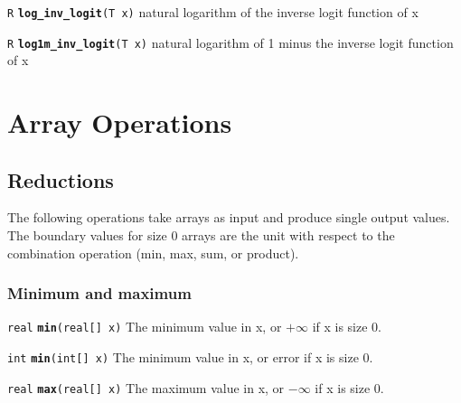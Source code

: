 \documentclass[
  10pt,
]{book}
\begin{document}
\texttt{R} \textbf{\texttt{log\_inv\_logit}}\texttt{(T\ x)}\newline
natural logarithm of the inverse logit function of x


\texttt{R} \textbf{\texttt{log1m\_inv\_logit}}\texttt{(T\ x)}\newline
natural logarithm of 1 minus the inverse logit function of x

\hypertarget{array-operations}{%
\chapter{Array Operations}\label{array-operations}}

\hypertarget{array-reductions}{%
\section{Reductions}\label{array-reductions}}

The following operations take arrays as input and produce single
output values. The boundary values for size 0 arrays are the unit
with respect to the combination operation (min, max, sum, or product).

\hypertarget{minimum-and-maximum}{%
\subsection{Minimum and maximum}\label{minimum-and-maximum}}


\texttt{real} \textbf{\texttt{min}}\texttt{(real{[}{]}\ x)}\newline
The minimum value in x, or \(+\infty\) if x is size 0.


\texttt{int} \textbf{\texttt{min}}\texttt{(int{[}{]}\ x)}\newline
The minimum value in x, or error if x is size 0.


\texttt{real} \textbf{\texttt{max}}\texttt{(real{[}{]}\ x)}\newline
The maximum value in x, or \(-\infty\) if x is size 0.

\end{document}
